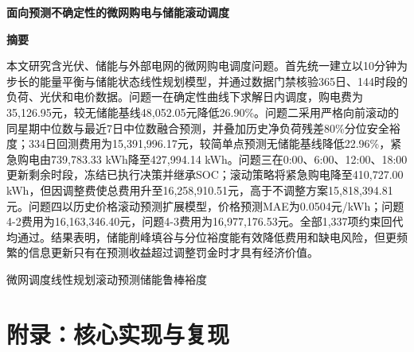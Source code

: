 \documentclass[fontset=fandol,12pt,a4paper]{ctexart}
\newcommand{\papertitle}[1]{\begin{center}{\zihao{2}\heiti\bfseries #1}\end{center}\vspace{0.8em}}
\newcommand{\abstractcn}[2]{\begin{center}{\zihao{3}\heiti\bfseries 摘要}\end{center}#1\par\vspace{0.8em}{\heiti\bfseries 关键词：}#2\newpage}
\begin{document}
\setcounter{page}{1}
\papertitle{面向预测不确定性的微网购电与储能滚动调度}
\abstractcn{本文研究含光伏、储能与外部电网的微网购电调度问题。首先统一建立以10分钟为步长的能量平衡与储能状态线性规划模型，并通过数据门禁核验365日、144时段的负荷、光伏和电价数据。问题一在确定性曲线下求解日内调度，购电费为35,126.95元，较无储能基线48,052.05元降低26.90\%。问题二采用严格向前滚动的同星期中位数与最近7日中位数融合预测，并叠加历史净负荷残差80\%分位安全裕度；334日回测费用为15,391,996.17元，较简单点预测无储能基线降低22.96\%，紧急购电由739,783.33 kWh降至427,994.14 kWh。问题三在0:00、6:00、12:00、18:00更新剩余时段，冻结已执行决策并继承SOC；滚动策略将紧急购电降至410,727.00 kWh，但因调整费使总费用升至16,258,910.51元，高于不调整方案15,818,394.81元。问题四以历史价格滚动预测扩展模型，价格预测MAE为0.0504元/kWh；问题4-2费用为16,163,346.40元，问题4-3费用为16,977,176.53元。全部1,337项约束回代均通过。结果表明，储能削峰填谷与分位裕度能有效降低费用和缺电风险，但更频繁的信息更新只有在预测收益超过调整罚金时才具有经济价值。}{微网调度\quad 线性规划\quad 滚动预测\quad 储能\quad 鲁棒裕度}






\newpage\section*{附录：核心实现与复现}
\end{document}
